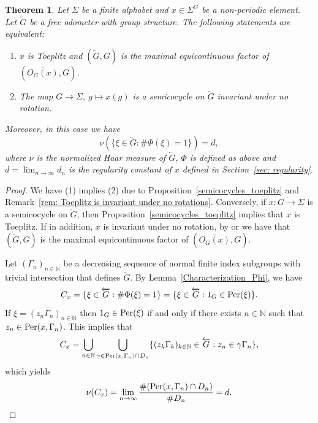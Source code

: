 \documentclass[titlepage,reqno,10pt]{amsart}
\newtheorem{theorem}{Theorem}[section]
\theoremstyle{definition}
\def\Per{{\rm Per}}
\begin{document}
 
\begin{theorem}\label{thm: chara. Toeplitz semicocycle}
 Let $\Sigma$  be a finite alphabet and $x\in\Sigma^G$ be a non-periodic element. Let $\overleftarrow{G}$ be a free odometer with group structure. %
 The following statements are equivalent:
 \begin{enumerate}
\item   $x$ is  Toeplitz  and $(\overleftarrow{G},G)$ is the maximal equicontinuous factor of $(\overline{O_G(x)},G)$.

\item The map $G\to \Sigma,\:g\mapsto x(g)$ is a semicocycle on $\overleftarrow{G}$   invariant under no rotation. 
\end{enumerate}
Moreover, in this case we have $$\nu(\{\xi\in\overleftarrow{G}: \#\Phi(\xi)=1  \}) = d,$$ where $\nu$ is the normalized Haar measure of $\overleftarrow{G}$,  $\Phi$ is defined as above and $d= \lim_{n\to\infty} d_n$ is the regularity constant of $x$ defined in Section~\ref{sec: regularity}.
\end{theorem}
\begin{proof}
We have (1) implies  (2) due to Proposition~\ref{semicocycles_toeplitz} and Remark~\ref{rem: Toeplitz is invariant under no rotations}. Conversely, if $x:G\to \Sigma$ is a semicocycle on $\overleftarrow{G}$, then Proposition~\ref{semicocycles_toeplitz} implies that $x$ is Toeplitz. If in addition, $x$ is invariant under no rotation,   by \cite[Theorem 2.5]{FK18} or \cite[Corollary 5]{CoPe08} we have that $(\overleftarrow{G},G)$ is the maximal equicontinuous factor of $(\overline{O_G(x)},G)$.  
       
  Let $(\Gamma_n)_{n\in\mathbb{N}}$ be a decreasing sequence of normal finite index subgroups with trivial intersection that defines $\overleftarrow{G}$.  By Lemma~\ref{Characterization_Phi}, we have
  $$
  C_x=\{\xi\in\overleftarrow{G}: \#\Phi(\xi)=1  \}=\{\xi\in\overleftarrow{G}: 1_G\in \Per(\xi)\}.
  $$
  If $\xi=(z_n\Gamma_n)_{n\in\mathbb{N}}$ then $1_G\in \Per(\xi)$ if and only if there exists $n\in\mathbb{N}$ such that $z_n \in\Per(x,\Gamma_n)$. This implies that
  $$
  C_x=\bigcup_{n\in\mathbb{N}}\bigcup_{\gamma\in \Per(x,\Gamma_n)\cap D_n}\{(z_k\Gamma_k)_{k\in\mathbb{N}}\in\overleftarrow{G}: z_n\in \gamma\Gamma_n\},
  $$
which yields
    $$ \nu(C_x) = \lim_{n\to\infty} \frac{\#(\Per(x,\Gamma_n)\cap D_n)}{\#D_n} = d.$$
    \end{proof}
\end{document}
